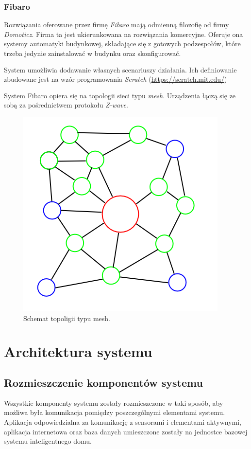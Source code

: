 \documentclass[eng,oneside]{mgr}
\begin{document}
\subsection{Fibaro}                                                                                              
Rozwiązania oferowane przez firmę \textit{Fibaro} mają odmienną filozofię od firmy \textit{Domoticz}. Firma ta jest ukierunkowana na rozwiązania komercyjne. Oferuje ona systemy automatyki budynkowej, składające się z gotowych podzespołów, które trzeba jedynie zainstalować w budynku oraz skonfigurować.

System umożliwia dodawanie własnych scenariuszy działania. Ich definiowanie zbudowane jest na wzór programowania \textit{Scratch} (\url{https://scratch.mit.edu/})

System Fibaro opiera się na topologii sieci typu \textit{mesh}. Urządzenia łączą się ze sobą za pośrednictwem protokołu \textit{Z-wave}.
\begin{figure}[h]
\centering
\includegraphics[width=0.4\linewidth]{mesh}
\caption{Schemat topoligii typu mesh.}
\label{fig:Mesh-Network}
\end{figure}

\chapter{Architektura systemu}
\section{Rozmieszczenie komponentów systemu}
Wszystkie komponenty systemu zostały rozmieszczone w taki sposób, aby możliwa była komunikacja pomiędzy poszczególnymi elementami systemu. Aplikacja odpowiedzialna za komunikację z sensorami i elementami aktywnymi, aplikacja internetowa oraz baza danych umieszczone zostały na jednostce bazowej systemu inteligentnego domu.
\end{document}
